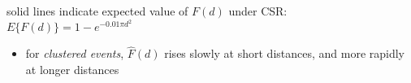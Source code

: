\documentclass[portrait]{seminar}
\begin{document}
%
%
\begin{slide*}
\begin{center}
 \vspace*{-0.5cm} 
\end{center}

\vspace{0.1cm}
\begin{center}
\begin{figure}
 \hspace{0.5cm}
\end{figure}
\end{center}

\vspace{0.1cm}
\begin{center}
\begin{figure}
\hspace{-0.3cm} 
\hspace{0.5cm}
\end{figure}
\end{center}

\begin{center}
{\small solid lines indicate expected value of $F(d)$ under CSR:
$E\{F(d)\} = 1 - e^{-0.01 \pi d^2 }$ }
\end{center}

\vspace{0.1cm}
\begin{itemize}
\item for {\em clustered events}, $\hat{F}(d)$ rises
slowly at short distances, and more rapidly at longer distances
\end{itemize}

\end{slide*}
\end{document}
